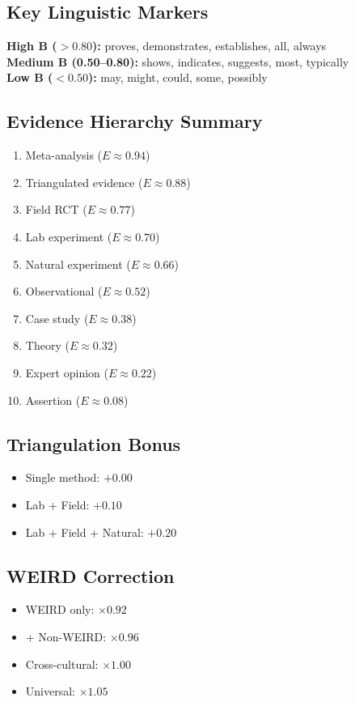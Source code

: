 \documentclass[11pt,a4paper]{article}
\begin{document}
\subsection{Key Linguistic Markers}
\textbf{High B ($>0.80$):} proves, demonstrates, establishes, all, always \\
\textbf{Medium B (0.50--0.80):} shows, indicates, suggests, most, typically \\
\textbf{Low B ($<0.50$):} may, might, could, some, possibly

\subsection{Evidence Hierarchy Summary}
\begin{enumerate}
    \item Meta-analysis ($E \approx 0.94$)
    \item Triangulated evidence ($E \approx 0.88$)
    \item Field RCT ($E \approx 0.77$)
    \item Lab experiment ($E \approx 0.70$)
    \item Natural experiment ($E \approx 0.66$)
    \item Observational ($E \approx 0.52$)
    \item Case study ($E \approx 0.38$)
    \item Theory ($E \approx 0.32$)
    \item Expert opinion ($E \approx 0.22$)
    \item Assertion ($E \approx 0.08$)
\end{enumerate}

\subsection{Triangulation Bonus}
\begin{itemize}
    \item Single method: $+0.00$
    \item Lab + Field: $+0.10$
    \item Lab + Field + Natural: $+0.20$
\end{itemize}

\subsection{WEIRD Correction}
\begin{itemize}
    \item WEIRD only: $\times 0.92$
    \item + Non-WEIRD: $\times 0.96$
    \item Cross-cultural: $\times 1.00$
    \item Universal: $\times 1.05$
\end{itemize}
\end{document}
